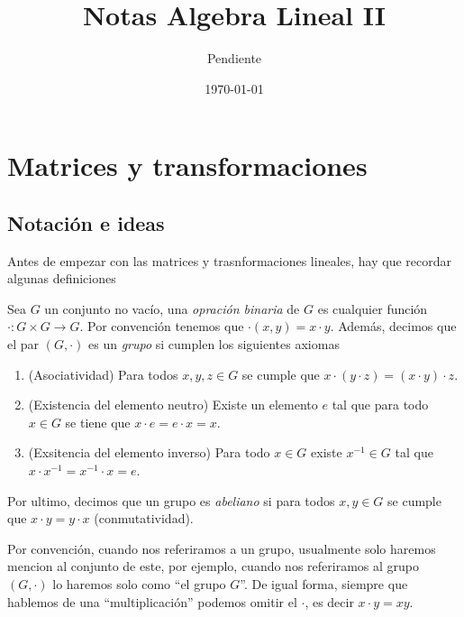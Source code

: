 \documentclass[11pt]{report}
\title{Notas Algebra Lineal II}
\author{Pendiente}
\date{\today}
\begin{document}
\maketitle

\chapter{Matrices y transformaciones}

\section{Notación e ideas}

Antes de empezar con las matrices y trasnformaciones lineales, hay que recordar algunas definiciones

\begin{defi}
  Sea $G$ un conjunto no vacío, una \emph{opración binaria} de $G$ es cualquier función $\cdot \colon G \times G \to G$. Por convención tenemos que $\cdot(x,y) = x \cdot y$. Además, decimos que el par $(G, \cdot)$ es un \emph{grupo} si cumplen los siguientes axiomas
  \begin{enumerate}
    \item (Asociatividad) Para todos $x, y, z \in G$ se cumple que $x\cdot(y\cdot z) = (x\cdot y)\cdot z$.
    \item (Existencia del elemento neutro) Existe un elemento $e$ tal que para todo $x \in G$ se tiene que $x\cdot e = e\cdot x = x$.
    \item (Exsitencia del elemento inverso) Para todo $x \in G$ existe $x^{-1} \in G$ tal que $x\cdot x^{-1} = x^{-1}\cdot x = e$.
  \end{enumerate}

  Por ultimo, decimos que un grupo es \emph{abeliano} si para todos $x, y \in G$ se cumple que $x\cdot y = y\cdot x$ (conmutatividad).
\end{defi}

Por convención, cuando nos referiramos a un grupo, usualmente solo haremos mencion al conjunto de este, por ejemplo, cuando nos referiramos al grupo $(G, \cdot)$ lo haremos solo como ``el grupo $G$''. De igual forma, siempre que hablemos de una ``multiplicación'' podemos omitir el $\cdot$, es decir $x \cdot y = xy$.
\end{document}
